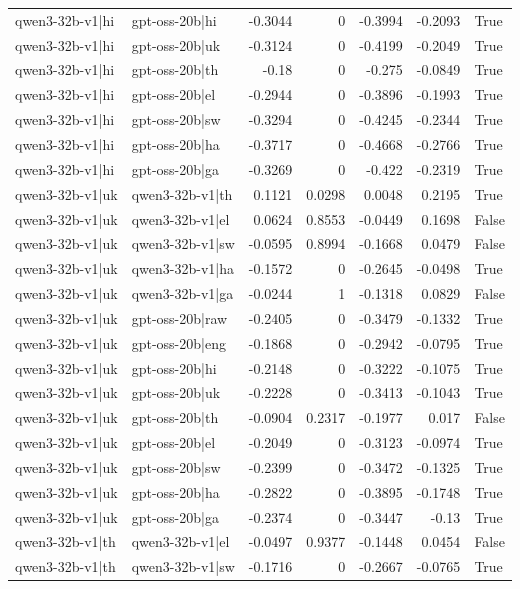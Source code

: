 \begin{table}
\begin{tabular}{l l r r r r l}
qwen3-32b-v1|hi & gpt-oss-20b|hi & -0.3044 & 0 & -0.3994 & -0.2093 & True \\
qwen3-32b-v1|hi & gpt-oss-20b|uk & -0.3124 & 0 & -0.4199 & -0.2049 & True \\
qwen3-32b-v1|hi & gpt-oss-20b|th & -0.18 & 0 & -0.275 & -0.0849 & True \\
qwen3-32b-v1|hi & gpt-oss-20b|el & -0.2944 & 0 & -0.3896 & -0.1993 & True \\
qwen3-32b-v1|hi & gpt-oss-20b|sw & -0.3294 & 0 & -0.4245 & -0.2344 & True \\
qwen3-32b-v1|hi & gpt-oss-20b|ha & -0.3717 & 0 & -0.4668 & -0.2766 & True \\
qwen3-32b-v1|hi & gpt-oss-20b|ga & -0.3269 & 0 & -0.422 & -0.2319 & True \\
qwen3-32b-v1|uk & qwen3-32b-v1|th & 0.1121 & 0.0298 & 0.0048 & 0.2195 & True \\
qwen3-32b-v1|uk & qwen3-32b-v1|el & 0.0624 & 0.8553 & -0.0449 & 0.1698 & False \\
qwen3-32b-v1|uk & qwen3-32b-v1|sw & -0.0595 & 0.8994 & -0.1668 & 0.0479 & False \\
qwen3-32b-v1|uk & qwen3-32b-v1|ha & -0.1572 & 0 & -0.2645 & -0.0498 & True \\
qwen3-32b-v1|uk & qwen3-32b-v1|ga & -0.0244 & 1 & -0.1318 & 0.0829 & False \\
qwen3-32b-v1|uk & gpt-oss-20b|raw & -0.2405 & 0 & -0.3479 & -0.1332 & True \\
qwen3-32b-v1|uk & gpt-oss-20b|eng & -0.1868 & 0 & -0.2942 & -0.0795 & True \\
qwen3-32b-v1|uk & gpt-oss-20b|hi & -0.2148 & 0 & -0.3222 & -0.1075 & True \\
qwen3-32b-v1|uk & gpt-oss-20b|uk & -0.2228 & 0 & -0.3413 & -0.1043 & True \\
qwen3-32b-v1|uk & gpt-oss-20b|th & -0.0904 & 0.2317 & -0.1977 & 0.017 & False \\
qwen3-32b-v1|uk & gpt-oss-20b|el & -0.2049 & 0 & -0.3123 & -0.0974 & True \\
qwen3-32b-v1|uk & gpt-oss-20b|sw & -0.2399 & 0 & -0.3472 & -0.1325 & True \\
qwen3-32b-v1|uk & gpt-oss-20b|ha & -0.2822 & 0 & -0.3895 & -0.1748 & True \\
qwen3-32b-v1|uk & gpt-oss-20b|ga & -0.2374 & 0 & -0.3447 & -0.13 & True \\
qwen3-32b-v1|th & qwen3-32b-v1|el & -0.0497 & 0.9377 & -0.1448 & 0.0454 & False \\
qwen3-32b-v1|th & qwen3-32b-v1|sw & -0.1716 & 0 & -0.2667 & -0.0765 & True \\

\end{tabular}
\end{table}
